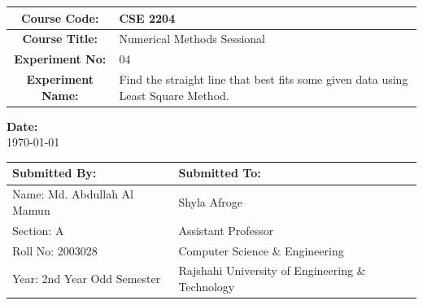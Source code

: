 \documentclass[a4paper,12pt]{report}
\begin{document}
\begin{titlepage}
\begin{center}
        \begin{table}[h]
            \centering
            \begin{tabularx}{0.7\paperwidth}{|c|X|}
                \hline
                \textbf{Course Code:}     & CSE 2204                                                                         \\
                \hline
                \textbf{Course Title:}    & Numerical Methods Sessional                                                      \\
                \hline
                \textbf{Experiment No:}   & 04                                                                               \\
                \hline
                \textbf{Experiment Name:} & Find the straight line that best fits some given data using Least Square Method. \\
                \hline
            \end{tabularx}
        \end{table}

        \vspace{0.5in}
        \textbf{Date:} \\
        \today

        \vfill

        \begin{table}[h]
            \centering
            \begin{tabularx}{0.7\paperwidth}{|X|X|}
                \hline
                Submitted By:               & Submitted To:                                    \\
                \hline
                Name: Md. Abdullah Al Mamun & Shyla Afroge                                     \\
                \hline
                Section: A                  & Assistant Professor                              \\
                \hline
                Roll No: 2003028            & Computer Science \& Engineering                  \\
                \hline
                Year: 2nd Year Odd Semester & Rajshahi University of Engineering \& Technology \\
                \hline
            \end{tabularx}
        \end{table}
    \end{center}
\end{titlepage}
\end{document}
